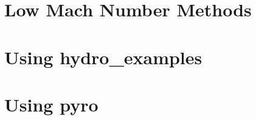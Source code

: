 \documentclass[11pt]{book}
\newcommand{\pyro}{{\sf pyro}}
\newcommand{\hydroex}{{\sf hydro\_examples}}
\begin{document}


\chapter{Low Mach Number Methods}



\appendix

\chapter{Using \hydroex}



\chapter{Using \pyro}





\backmatter




\end{document}
